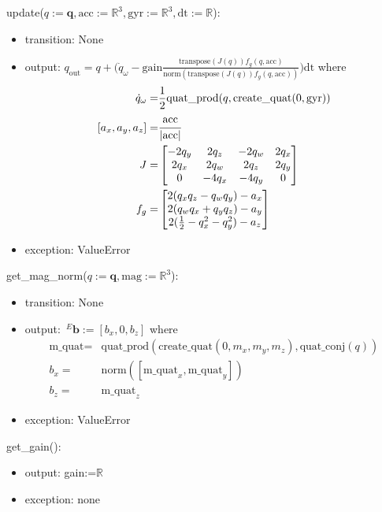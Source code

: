 \documentclass[12pt, titlepage]{article}
\begin{document}
\noindent update($q:=\mathbf{q}, \text{acc}:=\mathbb{R}^3, \text{gyr}:=\mathbb{R}^3, \text{dt}:=\mathbb{R}$):
\begin{itemize}
\item transition: None
\item output: $q_\text{out} = q + \Big( \dot{q}_{\omega} - \text{gain}\frac{\text{transpose}(J(q))f_g( q, \text{acc})}{\text{norm}(\text{transpose}(J(q))f_g( q, \text{acc}))}\Big) \text{dt}$ where
\begin{align*}
  \dot{q}_{\omega} =& \frac{1}{2} \text{quat\_prod}(q, \text{create\_quat}(0, \text{gyr})) \\
  [a_x, a_y, a_z] =& \cfrac{\text{acc}}{|\text{acc}|} \\
  J =& \begin{bmatrix}
    -2q_y & 2q_z & -2q_w & 2q_x \\
    2q_x & 2q_w & 2q_z & 2q_y \\
    0 & -4q_x & -4q_y & 0
    \end{bmatrix}\\
  f_{g} =& \begin{bmatrix}
    2(q_xq_z-q_wq_y)-a_x \\ 2(q_wq_x+q_yq_z)-a_y \\ 2(\frac{1}{2}-q_x^2-q_y^2)-a_z
  \end{bmatrix}
\end{align*}
\item exception: ValueError
\end{itemize}

\noindent get\_mag\_norm($q:=\mathbf{q}, \text{mag}:=\mathbb{R}^3$):
\begin{itemize}
\item transition: None
\item output: $\,^E\mathbf{b}:= [b_x, 0, b_z]$ where
\begin{align*}
  \text{m\_quat} =& \text{quat\_prod}(\text{create\_quat}(0, m_x, m_y, m_z), \text{quat\_conj}(q)) \\
  b_x =& \text{norm}([\text{m\_quat}_x, \text{m\_quat}_y]) \\
  b_z =& \text{m\_quat}_z
\end{align*}
\item exception: ValueError
\end{itemize}

\noindent get\_gain():
\begin{itemize}
\item output: gain:=$\mathbb{R}$
\item exception: none
\end{itemize}
\end{document}
